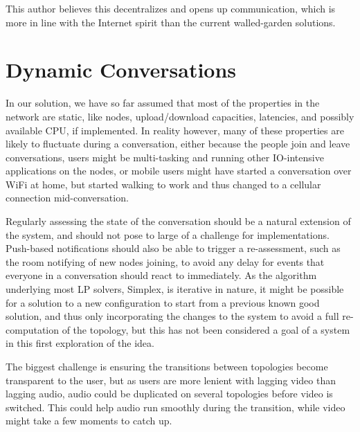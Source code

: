 This author believes this decentralizes and opens up communication, which is more in line with the Internet spirit than the current walled-garden solutions.


\section{Dynamic Conversations}\label{sec:dynamic-conversations}

In our solution, we have so far assumed that most of the properties in the network are static, like nodes, upload/download capacities, latencies, and possibly available CPU, if implemented. In reality however, many of these properties are likely to fluctuate during a conversation, either because the people join and leave conversations, users might be multi-tasking and running other IO-intensive applications on the nodes, or mobile users might have started a conversation over WiFi at home, but started walking to work and thus changed to a cellular connection mid-conversation.

Regularly assessing the state of the conversation should be a natural extension of the system, and should not pose to large of a challenge for implementations. Push-based notifications should also be able to trigger a re-assessment, such as the room notifying of new nodes joining, to avoid any delay for events that everyone in a conversation should react to immediately. As the algorithm underlying most LP solvers, Simplex, is iterative in nature, it might be possible for a solution to a new configuration to start from a previous known good solution, and thus only incorporating the changes to the system to avoid a full re-computation of the topology, but this has not been considered a goal of a system in this first exploration of the idea.

The biggest challenge is ensuring the transitions between topologies become transparent to the user, but as users are more lenient with lagging video than lagging audio, audio could be duplicated on several topologies before video is switched. This could help audio run smoothly during the transition, while video might take a few moments to catch up.
